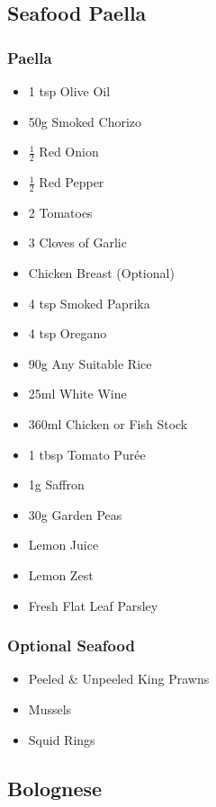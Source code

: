 \documentclass[11pt, english]{article}
\begin{document}
\newpage

	\subsection{Seafood Paella}

		\subsubsection*{Paella}

	\begin{itemize}
        \setlength\itemsep{0cm}
                \item 1 tsp Olive Oil
		\item 50g Smoked Chorizo
		\item $\frac{1}{2}$ Red Onion
		\item $\frac{1}{2}$ Red Pepper
		\item 2 Tomatoes
		\item 3 Cloves of Garlic
		\item Chicken Breast (Optional)
		\item 4 tsp Smoked Paprika
		\item 4 tsp Oregano
		\item 90g Any Suitable Rice
		\item 25ml White Wine
		\item 360ml Chicken or Fish Stock
		\item 1 tbsp Tomato Pur\'{e}e
		\item 1g Saffron
		\item 30g Garden Peas
		\item Lemon Juice
		\item Lemon Zest
		\item Fresh Flat Leaf Parsley
        \end{itemize}

		\subsubsection*{Optional Seafood}

	\begin{itemize}
        \setlength\itemsep{0cm}
		\item Peeled \& Unpeeled King Prawns
		\item Mussels
		\item Squid Rings
        \end{itemize}

\newpage

	\subsection{Bolognese}
\end{document}
